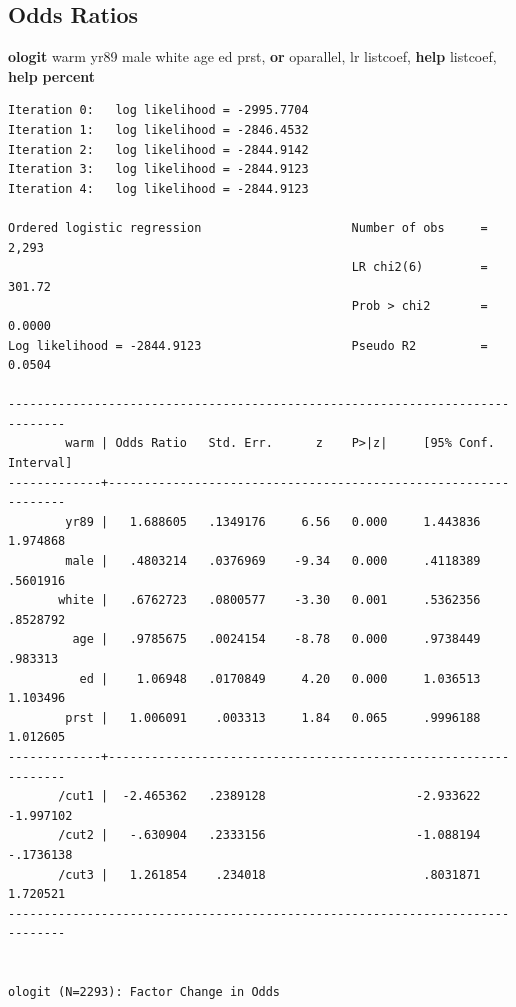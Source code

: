 \documentclass[
]{book}
\newenvironment{Shaded}{\begin{snugshade}}{\end{snugshade}}
\newcommand{\BaseNTok}[1]{\textcolor[rgb]{0.00,0.00,0.81}{#1}}
\newcommand{\KeywordTok}[1]{\textcolor[rgb]{0.13,0.29,0.53}{\textbf{#1}}}
\newcommand{\NormalTok}[1]{#1}
\begin{document}
\subsection{Odds Ratios}\label{odds-ratios-1}

\begin{Shaded}
\begin{Highlighting}[]
\KeywordTok{ologit}\NormalTok{ warm yr89 male }\BaseNTok{white}\NormalTok{ age ed prst, }\KeywordTok{or}
\NormalTok{oparallel, lr}
\NormalTok{listcoef, }\KeywordTok{help}
\NormalTok{listcoef, }\KeywordTok{help} \KeywordTok{percent}
\end{Highlighting}
\end{Shaded}

\begin{verbatim}
Iteration 0:   log likelihood = -2995.7704  
Iteration 1:   log likelihood = -2846.4532  
Iteration 2:   log likelihood = -2844.9142  
Iteration 3:   log likelihood = -2844.9123  
Iteration 4:   log likelihood = -2844.9123  

Ordered logistic regression                     Number of obs     =      2,293
                                                LR chi2(6)        =     301.72
                                                Prob > chi2       =     0.0000
Log likelihood = -2844.9123                     Pseudo R2         =     0.0504

------------------------------------------------------------------------------
        warm | Odds Ratio   Std. Err.      z    P>|z|     [95% Conf. Interval]
-------------+----------------------------------------------------------------
        yr89 |   1.688605   .1349176     6.56   0.000     1.443836    1.974868
        male |   .4803214   .0376969    -9.34   0.000     .4118389    .5601916
       white |   .6762723   .0800577    -3.30   0.001     .5362356    .8528792
         age |   .9785675   .0024154    -8.78   0.000     .9738449     .983313
          ed |    1.06948   .0170849     4.20   0.000     1.036513    1.103496
        prst |   1.006091    .003313     1.84   0.065     .9996188    1.012605
-------------+----------------------------------------------------------------
       /cut1 |  -2.465362   .2389128                     -2.933622   -1.997102
       /cut2 |   -.630904   .2333156                     -1.088194   -.1736138
       /cut3 |   1.261854    .234018                      .8031871    1.720521
------------------------------------------------------------------------------


ologit (N=2293): Factor Change in Odds 


\end{verbatim}
\end{document}
